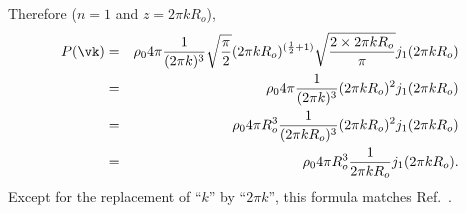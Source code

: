 \documentclass{article}
\begin{document}
Therefore ($n=1$ and $z=2\pi kR_o$),
\begin{eqnarray}
P(\vk)
&=&
\rho_0
4\pi
\frac{1}{(2\pi k)^3}
\sqrt{\frac{\pi}{2}}
(2\pi kR_o)^{(\frac{1}{2}+1)}
\sqrt{\frac{2\times 2\pi kR_o}{\pi}}
j_1(2\pi kR_o)
\\
&=&
\rho_0
4\pi
\frac{1}{(2\pi k)^3}
(2\pi kR_o)^2
j_1(2\pi kR_o)
\\
&=&
\rho_0
4\pi
R_o^3
\frac{1}{(2\pi kR_o)^3}
(2\pi kR_o)^2
j_1(2\pi kR_o)
\\
&=&
\rho_0
4\pi
R_o^3
\frac{1}{2\pi kR_o}
j_1(2\pi kR_o)
.
\end{eqnarray}
Except for the replacement of ``$k$'' by ``$2\pi k$'', this formula matches
Ref.~\cite[formula between Eqs.~20
  and~21]{ZhengDoerschukJohnsonBiophysicalJ1995}.
%
%


\end{document}
